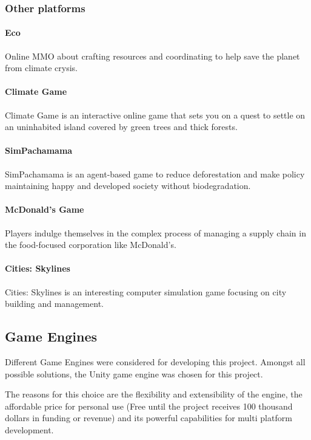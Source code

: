 \subsubsection{Other platforms}

\paragraph{Eco}
Online MMO about crafting resources and coordinating to help
save the planet from climate crysis.

\paragraph{Climate Game}
Climate Game is an interactive online game that sets you on a quest to
settle on an uninhabited island covered by green trees and thick forests.

\paragraph{SimPachamama}
SimPachamama is an agent-based game to reduce deforestation and make
policy maintaining happy and developed society without biodegradation.


\paragraph{McDonald's Game}
Players indulge themselves in the complex process of managing a
supply chain in the food-focused corporation like McDonald’s.

\paragraph{Cities: Skylines}
Cities: Skylines is an interesting computer simulation game focusing 
on city building and management.

\subsection{Game Engines}

Different Game Engines were considered for developing this project. Amongst  all possible solutions, the Unity game engine was chosen for this project.

The reasons for this choice are the flexibility and extensibility of the engine, the affordable price for personal use (Free until the project receives 100 thousand dollars in funding or revenue) and its powerful capabilities for multi platform development.  

